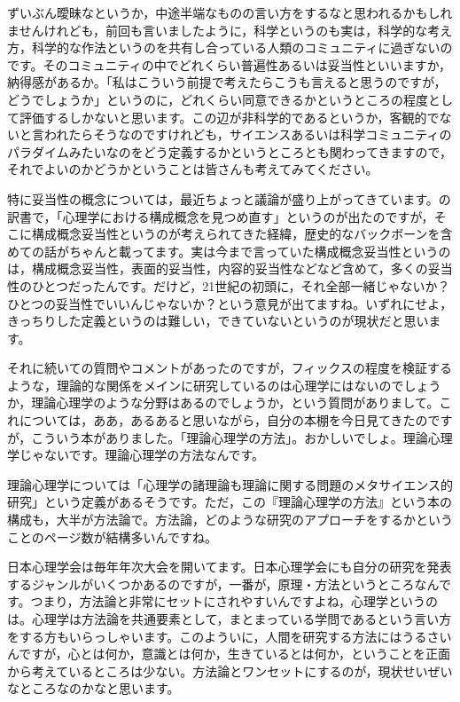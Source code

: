 \documentclass{ltjsbook}
\begin{document}
ずいぶん曖昧なというか，中途半端なものの言い方をするなと思われるかもしれませんけれども，前回も言いましたように，科学というのも実は，科学的な考え方，科学的な作法というのを共有し合っている人類のコミュニティに過ぎないのです。そのコミュニティの中でどれくらい普遍性あるいは妥当性といいますか，納得感があるか。「私はこういう前提で考えたらこうも言えると思うのですが，どうでしょうか」というのに，どれくらい同意できるかというところの程度として評価するしかないと思います。この辺が非科学的であるというか，客観的でないと言われたらそうなのですけれども，サイエンスあるいは科学コミュニティのパラダイムみたいなのをどう定義するかというところとも関わってきますので，それでよいのかどうかということは皆さんも考えてみてください。

特に妥当性の概念については，最近ちょっと議論が盛り上がってきています。\textcite{Kathleen2017}の訳書で，「心理学における構成概念を見つめ直す」というのが出たのですが，そこに構成概念妥当性というのが考えられてきた経緯，歴史的なバックボーンを含めての話がちゃんと載ってます。実は今まで言っていた構成概念妥当性というのは，構成概念妥当性，表面的妥当性，内容的妥当性などなど含めて，多くの妥当性のひとつだったんです。だけど，21世紀の初頭に，それ全部一緒じゃないか？ひとつの妥当性でいいんじゃないか？という意見が出てますね。いずれにせよ，きっちりした定義というのは難しい，できていないというのが現状だと思います。

それに続いての質問やコメントがあったのですが，フィックスの程度を検証するような，理論的な関係をメインに研究しているのは心理学にはないのでしょうか，理論心理学のような分野はあるのでしょうか，という質問がありまして。これについては，ああ，あるあると思いながら，自分の本棚を今日見てきたのですが，こういう本がありました。「理論心理学の方法」\parencite{Kukla2001}。おかしいでしょ。理論心理学じゃないです。理論心理学の方法なんです。

理論心理学については「心理学の諸理論も理論に関する問題のメタサイエンス的研究」という定義があるそうです。ただ，この『理論心理学の方法』という本の構成も，大半が方法論で。方法論，どのような研究のアプローチをするかということのページ数が結構多いんですね。

日本心理学会は毎年年次大会を開いてます。日本心理学会にも自分の研究を発表するジャンルがいくつかあるのですが，一番が，原理・方法というところなんです。つまり，方法論と非常にセットにされやすいんですよね，心理学というのは。心理学は方法論を共通要素として，まとまっている学問であるという言い方をする方もいらっしゃいます。このよういに，人間を研究する方法にはうるさいんですが，心とは何か，意識とは何か，生きているとは何か，ということを正面から考えているところは少ない。方法論とワンセットにするのが，現状せいぜいなところなのかなと思います。
\end{document}

